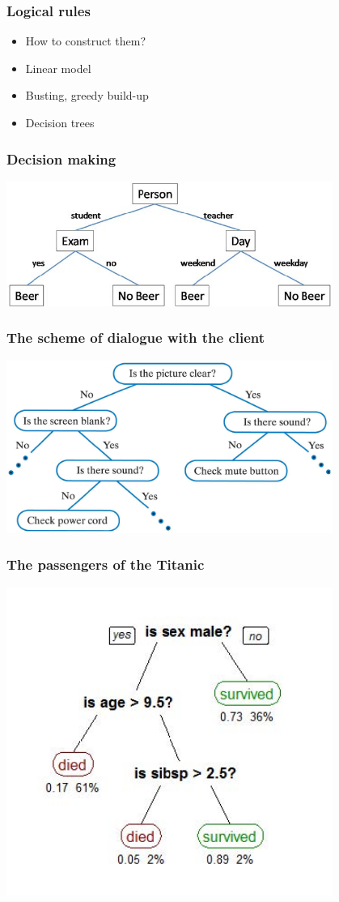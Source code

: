 \documentclass[default]{beamer}
\begin{document}
	\begin{frame}
		\frametitle{Logical rules}
		
		\Large
		\begin{itemize}
			\item How to construct them?
			\item Linear model
			\item Busting, greedy build-up
			\item Decision trees
		\end{itemize}
	\end{frame}

	\begin{frame}
		\frametitle{Decision making}
		\centering
		\includegraphics[width=0.8\textwidth]{trees1.jpg}
	\end{frame}

	\begin{frame}
		\frametitle{The scheme of dialogue with the client}
		
		\centering
		\includegraphics[width=0.8\textwidth]{trees2.jpg}
	\end{frame}

	\begin{frame}
		\frametitle{The passengers of the Titanic}
		
		\centering
		\includegraphics[width=0.8\textwidth]{trees3.jpg}
	\end{frame}
\end{document}
